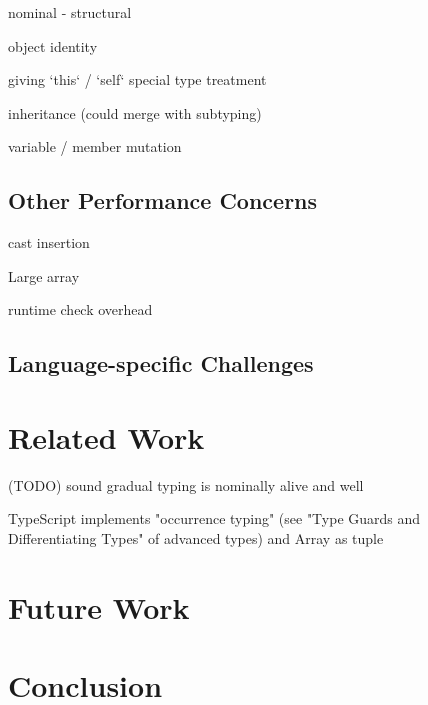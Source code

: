nominal
- structural

object identity

giving `this` / `self` special type treatment

inheritance (could merge with subtyping)

variable / member mutation

\section{Other Performance Concerns}

cast insertion

Large array

runtime check overhead

\section{Language-specific Challenges}

\renewcommand{\thechapter}{4}
\chapter{Related Work}

(TODO) sound gradual typing is nominally alive and well


TypeScript implements "occurrence typing" (see "Type Guards and Differentiating Types" of advanced types) and Array as tuple 
\renewcommand{\thechapter}{5}

\chapter{Future Work}

\renewcommand{\thechapter}{6}
\chapter{Conclusion}